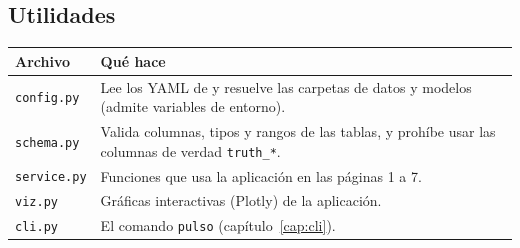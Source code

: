 \subsection*{Utilidades}
\begin{longtable}{L{0.24\textwidth}L{0.68\textwidth}}
\toprule
\textbf{Archivo} & \textbf{Qué hace} \\
\midrule
\endhead
\texttt{config.py} & Lee los YAML de  y resuelve las carpetas de datos y
modelos (admite variables de entorno). \\
\texttt{schema.py} & Valida columnas, tipos y rangos de las tablas, y prohíbe usar las
columnas de verdad \texttt{truth\_*}. \\
\texttt{service.py} & Funciones que usa la aplicación en las páginas 1 a 7. \\
\texttt{viz.py} & Gráficas interactivas (Plotly) de la aplicación. \\
\texttt{cli.py} & El comando \texttt{pulso} (capítulo~\ref{cap:cli}). \\
\bottomrule
\end{longtable}

